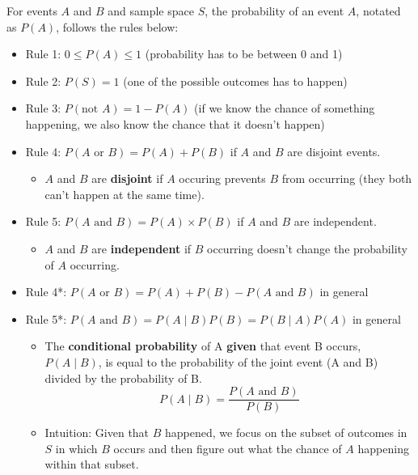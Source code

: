 \documentclass[
]{book}
\providecommand{\tightlist}{%
  \setlength{\itemsep}{0pt}\setlength{\parskip}{0pt}}
\begin{document}
For events \(A\) and \(B\) and sample space \(S\), the probability of an event \(A\), notated as \(P(A)\), follows the rules below:

\begin{itemize}
\tightlist
\item
  Rule 1: \(0\leq P(A)\leq 1\) (probability has to be between 0 and 1)
\item
  Rule 2: \(P(S) = 1\) (one of the possible outcomes has to happen)
\item
  Rule 3: \(P(\text{not }A) = 1 - P(A)\) (if we know the chance of something happening, we also know the chance that it doesn't happen)
\item
  Rule 4: \(P(A\text{ or }B) = P(A) + P(B)\) if \(A\) and \(B\) are disjoint events.

  \begin{itemize}
  \tightlist
  \item
    \(A\) and \(B\) are \textbf{disjoint} if \(A\) occuring prevents \(B\) from occurring (they both can't happen at the same time).
  \end{itemize}
\item
  Rule 5: \(P(A\text{ and }B) = P(A)\times P(B)\) if \(A\) and \(B\) are independent.

  \begin{itemize}
  \tightlist
  \item
    \(A\) and \(B\) are \textbf{independent} if \(B\) occurring doesn't change the probability of \(A\) occurring.
  \end{itemize}
\item
  Rule 4*: \(P(A\text{ or }B) = P(A) + P(B) - P(A\text{ and } B)\) in general
\item
  Rule 5*: \(P(A\text{ and }B) = P(A \mid B)P(B) = P(B \mid A)P(A)\) in general

  \begin{itemize}
  \tightlist
  \item
    The \textbf{conditional probability} of A \textbf{given} that event B occurs, \(P(A \mid B)\), is equal to the probability of the joint event (A and B) divided by the probability of B.
    \[ P(A \mid B) = \frac{P(A \text{ and } B)}{P(B)} \]
  \item
    Intuition: Given that \(B\) happened, we focus on the subset of outcomes in \(S\) in which \(B\) occurs and then figure out what the chance of \(A\) happening within that subset.
  \end{itemize}
\end{itemize}
\end{document}
